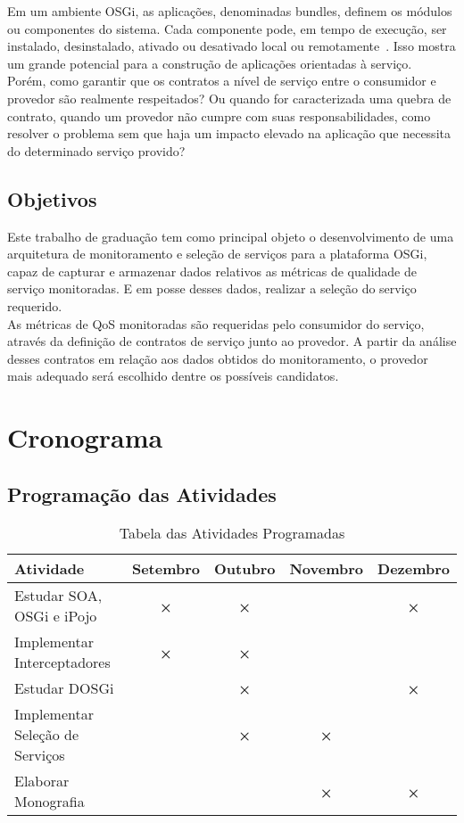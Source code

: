 Em um ambiente OSGi, as aplicações, denominadas bundles, definem os módulos ou componentes do sistema. Cada componente pode, em tempo de execução, ser instalado, desinstalado, ativado ou desativado local ou remotamente~\cite{alliance2007osgi}. Isso mostra um grande potencial para a construção de aplicações orientadas à serviço.\\

Porém, como garantir que os contratos a nível de serviço entre o consumidor e provedor são realmente respeitados? Ou quando for caracterizada uma quebra de contrato, quando um provedor não cumpre com suas responsabilidades, como resolver o problema sem que haja um impacto elevado na aplicação que necessita do determinado serviço provido?

\newpage
\section{Objetivos}
\label{pr:objectives}

Este trabalho de graduação tem como principal objeto o desenvolvimento de uma arquitetura de monitoramento e seleção de serviços para a plataforma OSGi, capaz de capturar e armazenar dados relativos as métricas de qualidade de serviço monitoradas. E em posse desses dados, realizar a seleção do serviço requerido.
\\

As métricas de QoS monitoradas são requeridas pelo consumidor do serviço, através da definição de contratos de serviço junto ao provedor. A partir da análise desses contratos em relação aos dados obtidos do monitoramento, o provedor mais adequado será escolhido dentre os possíveis candidatos.

\newpage
\chapter{Cronograma}
\label{pr:chrono}

\section{Programaç\~ao das Atividades}
{%
\begin{center}
\begin{table*}[h]
\begin{supertabular}[]{|l|c|c|c|c|}\hline
\textbf{Atividade} & \textbf{Setembro} & \textbf{Outubro} & \textbf{Novembro} & \textbf{Dezembro}\\\hline
Estudar SOA, OSGi e iPojo& \textbf{×} & \textbf{×} &   & \textbf{×}\\\hline
Implementar Interceptadores & \textbf{×} & \textbf{×} &  & \\\hline
Estudar DOSGi &   & \textbf{×} &   & \textbf{×}\\\hline
Implementar Seleção de Serviços &   & \textbf{×} & \textbf{×} &  \\\hline
Elaborar Monografia &   &   & \textbf{×} & \textbf{×}\\\hline
\end{supertabular}
\caption{Tabela das Atividades Programadas}
\end{table*}
\end{center}
}%

